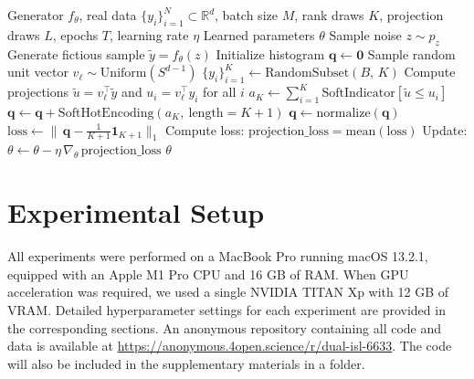 \documentclass{article}
\begin{document}
\begin{algorithm}[ht!]
\caption{Dual‐ISL with Random Projections}\label{alg:dual-isl-multidim}
\begin{algorithmic}[1]
  \REQUIRE Generator $f_{\theta}$, real data $\{y_i\}_{i=1}^N\subset\mathbb{R}^d$, batch size $M$, rank draws $K$, projection draws $L$, epochs $T$, learning rate $\eta$
  \ENSURE  Learned parameters $\theta$
      \STATE Sample noise $z \sim p_z$
      \STATE Generate fictious sample $\tilde y = f_\theta(z)$
      \STATE Initialize histogram $\mathbf{q} \leftarrow \mathbf{0}$
        \STATE Sample random unit vector $v_\ell\sim \mathrm{Uniform}(S^{d-1})$
            \STATE $\{y_i\}_{i=1}^{K} \gets \text{RandomSubset}(B,\,K)$  
            \STATE Compute projections $\tilde u = v_\ell^\top \tilde y$ and $u_i = v_\ell^\top y_i$ for all $i$
            \STATE $a_K \leftarrow \sum_{i=1}^K \mathrm{SoftIndicator}[\tilde u \le u_{i}]$ 
            \STATE $\mathbf{q}\leftarrow \mathbf{q} + \mathrm{SoftHotEncoding}(a_K,\ \text{length}=K+1)$ 
        \ENDFOR
        \STATE $\mathbf{q} \leftarrow \mathrm{normalize}(\mathbf{q})$
        \STATE $\mathrm{loss} \leftarrow \|\,\mathbf{q} - \tfrac{1}{K+1}\mathbf1_{K+1}\|_1$
      \ENDFOR
      \STATE Compute loss: $\mathrm{projection\_loss = \mathrm{mean}(loss)}$
      \STATE Update: $\theta \leftarrow \theta - \eta\,\nabla_\theta\,\mathrm{projection\_loss}$
    \ENDFOR
  \ENDFOR
  \RETURN $\theta$
\end{algorithmic}
\end{algorithm}

\newpage

\section{Experimental Setup}\label{Experimental Setup}
All experiments were performed on a MacBook Pro running macOS 13.2.1, equipped with an Apple M1 Pro CPU and 16 GB of RAM. When GPU acceleration was required, we used a single NVIDIA TITAN Xp with 12 GB of VRAM. Detailed hyperparameter settings for each experiment are provided in the corresponding sections. An anonymous repository containing all code and data is available at \url{https://anonymous.4open.science/r/dual-isl-6633}. The code will also be included in the supplementary materials in a folder.
\end{document}
